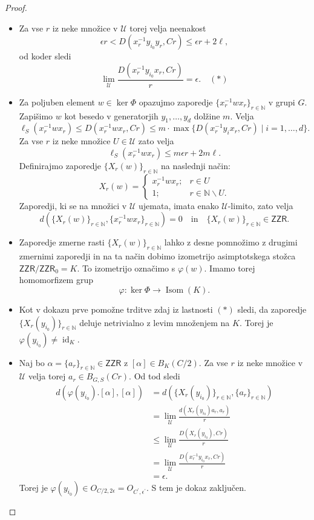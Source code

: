 \documentclass[11pt]{book}
\def\NN{\mathbb{N}}
\def\UU{\mathcal{U}}
\def\ZR{\mathsf{ZZR}}
\DeclareMathOperator\Isom{Isom}
\DeclareMathOperator\id{id}
\theoremstyle{definition}
\theoremstyle{zgled}
\theoremstyle{odprtproblem}
\theoremstyle{domacanaloga}
\newenvironment{dokaz}
    {\color{siva}\begin{proof}}
    {\end{proof}}
\theoremstyle{izrek}
\begin{document}
\begin{dokaz}
\begin{itemize}
    \item Za vse $r$ iz neke množice v $\UU$ torej velja neenakost
    \[
    \epsilon r < D(x_r^{-1} y_{i_0} y_r, Cr) \leq \epsilon r + 2 \ell, 
    \]
    od koder sledi
    \[
    \lim_\UU \frac{D(x_r^{-1} y_{i_0} x_r, Cr)}{r} = \epsilon. \quad (*)
    \]

    \item Za poljuben element $w \in \ker \Phi$ opazujmo zaporedje $\{ x_r^{-1} w x_r \}_{r \in \NN}$ v grupi $G$. Zapišimo $w$ kot besedo v generatorjih $y_1, \dots, y_d$ dolžine $m$. Velja
    \[
    \ell_S(x_r^{-1} w x_r) \leq D(x_r^{-1} w x_r, Cr) \leq m \cdot \max \{ D(x_r^{-1} y_i x_r, Cr) \mid i = 1, \dots, d \}.
    \]
    Za vse $r$ iz neke množice $U \in \UU$ zato velja
    \[
    \ell_S(x_r^{-1} w x_r) \leq m \epsilon r + 2 m \ell.
    \]
    Definirajmo zaporedje $\{ X_r(w) \}_{r \in \NN}$ na naslednji način: 
    \[
    X_r(w) =
    \begin{cases}
    x_r^{-1} w x_r; & r \in U \\
    1; & r \in \NN \backslash U.
    \end{cases}
    \]
    Zaporedji, ki se na množici v $\UU$ ujemata, imata enako $\UU$-limito, zato velja
    \[
    d(\{ X_r(w) \}_{r \in \NN}, \{ x_r^{-1} w x_r \}_{r \in \NN}) = 0
    \quad
    \text{in}
    \quad
    \{ X_r(w) \}_{r \in \NN} \in \ZR.
    \]
    
    \item Zaporedje zmerne rasti $\{ X_r(w) \}_{r \in \NN}$ lahko z desne pomnožimo z drugimi zmernimi zaporedji in na ta način dobimo izometrijo asimptotskega stožca $\ZR/\ZR_0 = K$. To izometrijo označimo s $\varphi(w)$. Imamo torej homomorfizem grup
    \[
    \varphi \colon \ker \Phi \to \Isom(K).
    \]

    \item Kot v dokazu prve pomožne trditve zdaj iz lastnosti $(*)$ sledi, da zaporedje $\{ X_r(y_{i_0}) \}_{r \in \NN}$ deluje netrivialno z levim množenjem na $K$. Torej je $\varphi(y_{i_0}) \neq \id_K$.

    \item Naj bo $\alpha = \{ a_r \}_{r \in \NN} \in \ZR$ z $[\alpha] \in B_K(C/2)$. Za vse $r$ iz neke množice v $\UU$ velja torej $a_r \in B_{G,S}(Cr)$. Od tod sledi
    \begin{align*}
    d(\varphi(y_{i_0}).[\alpha], [\alpha])
    &= d(\{ X_r(y_{i_0})\}_{r \in \NN}, \{ a_r \}_{r \in \NN}) \\
    &= \lim_\UU \frac{d(X_r(y_{i_0}) a_r, a_r)}{r} \\
    &\leq \lim_\UU \frac{D(X_r(y_{i_0}), Cr)}{r} \\
    &= \lim_\UU \frac{D(x_r^{-1} y_{i_0} x_r, Cr)}{r} \\
    &= \epsilon.
    \end{align*}
    Torej je $\varphi(y_{i_0}) \in O_{C/2, 2\epsilon} = O_{C^\prime, \epsilon^\prime}$. S tem je dokaz zaključen. 
\end{itemize}\vspace{-1.5\baselineskip}
\end{dokaz}
\end{document}
